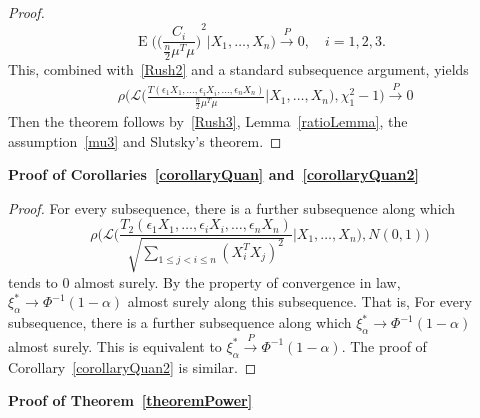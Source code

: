 \documentclass[review]{elsarticle}
\DeclareMathOperator{\myE}{E}
\theoremstyle{plain}
\theoremstyle{definition}
\theoremstyle{remark}
\begin{document}
\begin{proof}
    \begin{equation*}
    \myE\Big({\Big(\frac{C_i}{\frac{n}{2}\mu^T\mu}\Big)}^2\Big|X_1,\ldots,X_n\Big)\xrightarrow{P} 0,\quad i=1,2,3.
    \end{equation*}
    This, combined with~\eqref{Rush2} and a standard subsequence argument, yields
    \begin{equation}\label{Rush3}
        \begin{aligned}
            &\rho\Big(\mathcal{L}\Big(\frac{T(\epsilon_1 X_1,\ldots, \epsilon_i X_i,\ldots,\epsilon_n X_n)}{\frac{n}{2}\mu^T \mu}\Big| X_1,\ldots,X_n\Big),\chi^2_1-1\Big)
            \xrightarrow{P} 0
        \end{aligned}
    \end{equation}
    Then the theorem follows by~\eqref{Rush3},  Lemma~\ref{ratioLemma}, the assumption~\eqref{mu3} and Slutsky's theorem.
\end{proof}

\textbf{\textbf{Proof of Corollaries~\ref{corollaryQuan} and~\ref{corollaryQuan2}}}

\begin{proof}
    For every subsequence, there is a further subsequence along which
    \begin{equation*}
        \rho\Big(\mathcal{L}\Big(\frac{T_2(\epsilon_1 X_1,\ldots, \epsilon_i X_i,\ldots,\epsilon_n X_n)}{\sqrt{\sum_{1\leq j<i\leq n}{(X_i^T X_j)}^2}}\Big|X_1,\ldots,X_n\Big),N(0,1)\Big)
    \end{equation*}
    tends to $0$ almost surely.
    By the property of convergence in law, $\xi^*_\alpha\to \Phi^{-1}(1-\alpha)$ almost surely along this subsequence.
    That is, For every subsequence, there is a further subsequence along which $\xi^*_\alpha\to \Phi^{-1}(1-\alpha)$ almost surely.
    This is equivalent to $\xi_{\alpha}^*  \xrightarrow{P}\Phi^{-1}(1-\alpha)$.
    The proof of Corollary~\ref{corollaryQuan2} is similar.

\end{proof}

\textbf{Proof of Theorem~\ref{theoremPower}}
\end{document}
